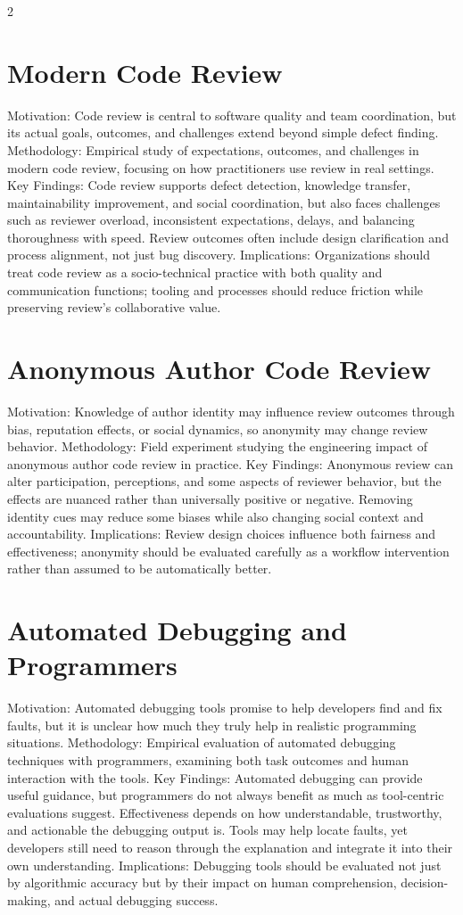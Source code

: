\documentclass[8pt,a4paper]{extarticle}
\begin{document}
\begin{multicols*}{2}
    \section{Modern Code Review}
    Motivation: Code review is central to software quality and team coordination, but its actual goals, outcomes, and challenges extend beyond simple defect finding. Methodology: Empirical study of expectations, outcomes, and challenges in modern code review, focusing on how practitioners use review in real settings. Key Findings: Code review supports defect detection, knowledge transfer, maintainability improvement, and social coordination, but also faces challenges such as reviewer overload, inconsistent expectations, delays, and balancing thoroughness with speed. Review outcomes often include design clarification and process alignment, not just bug discovery. Implications: Organizations should treat code review as a socio-technical practice with both quality and communication functions; tooling and processes should reduce friction while preserving review’s collaborative value.

    \section{Anonymous Author Code Review}
    Motivation: Knowledge of author identity may influence review outcomes through bias, reputation effects, or social dynamics, so anonymity may change review behavior. Methodology: Field experiment studying the engineering impact of anonymous author code review in practice. Key Findings: Anonymous review can alter participation, perceptions, and some aspects of reviewer behavior, but the effects are nuanced rather than universally positive or negative. Removing identity cues may reduce some biases while also changing social context and accountability. Implications: Review design choices influence both fairness and effectiveness; anonymity should be evaluated carefully as a workflow intervention rather than assumed to be automatically better.

    \section{Automated Debugging and Programmers}
    Motivation: Automated debugging tools promise to help developers find and fix faults, but it is unclear how much they truly help in realistic programming situations. Methodology: Empirical evaluation of automated debugging techniques with programmers, examining both task outcomes and human interaction with the tools. Key Findings: Automated debugging can provide useful guidance, but programmers do not always benefit as much as tool-centric evaluations suggest. Effectiveness depends on how understandable, trustworthy, and actionable the debugging output is. Tools may help locate faults, yet developers still need to reason through the explanation and integrate it into their own understanding. Implications: Debugging tools should be evaluated not just by algorithmic accuracy but by their impact on human comprehension, decision-making, and actual debugging success.

\end{multicols*}
\end{document}
